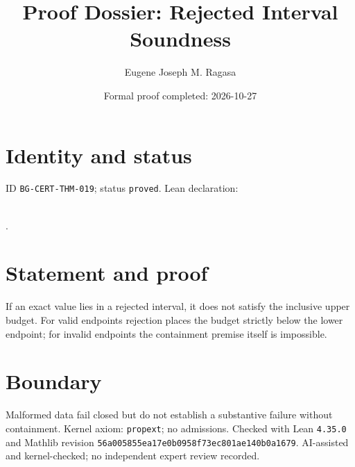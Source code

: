 \documentclass[11pt]{article}
\title{Proof Dossier: Rejected Interval Soundness}\author{Eugene Joseph M. Ragasa}\date{Formal proof completed: 2026-10-27}
\begin{document}
\maketitle
\section{Identity and status}
ID \texttt{BG-CERT-THM-019}; status \texttt{proved}. Lean declaration:
\par{}\\
{\tiny{}}.
\section{Statement and proof}
If an exact value lies in a rejected interval, it does not satisfy the inclusive upper
budget. For valid endpoints rejection places the budget strictly below the lower endpoint;
for invalid endpoints the containment premise itself is impossible.
\section{Boundary}
Malformed data fail closed but do not establish a substantive failure without containment.
Kernel axiom: \texttt{propext}; no admissions. Checked with Lean \texttt{4.35.0} and
Mathlib revision \texttt{56a005855ea17e0b0958f73ec801ae140b0a1679}. AI-assisted and
kernel-checked; no independent expert review recorded.
\end{document}
